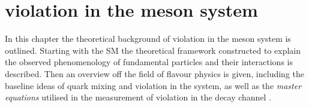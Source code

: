 
\chapter[
  head={\CP violation in the \Bd meson system},
  tocentry={\CPbfsfHyperref violation in the \BbfsfHyperref meson system}
]
{\CPbfsf violation in the \Bdbfsf meson system}
\label{ch:cpv_theory}

In this chapter the theoretical background of \CP violation in the \Bd meson
system is outlined. Starting with the \acl*{SM} the theoretical framework
constructed to explain the observed phenomenology of fundamental particles and
their interactions is described. Then an overview off the field of flavour
physics is given, including the baseline ideas of quark mixing and \CP violation
in the \Bmeson system, as well as the \emph{master equations} utilised in the
measurement of \CP violation in the decay channel \BdToJpsiKS.






